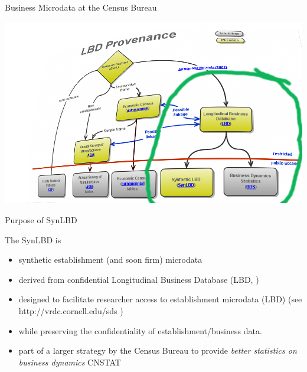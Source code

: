 \begin{frame}{Business Microdata at the Census Bureau}
\begin{center}
\includegraphics[height=0.8\textheight]{./LBD_Provenance_v2_tilted_hilite}
\end{center}
\end{frame}


\begin{frame}{Purpose of SynLBD}
\begin{block}{The SynLBD is }
\begin{itemize}[<+->]
\item synthetic establishment (and soon firm) microdata
\item derived from \alert{confidential} Longitudinal Business Database (LBD, 
\cite{MirandaJarmin2002})
\item designed to facilitate researcher access to establishment microdata (LBD) (see 
http://vrdc.cornell.edu/sds )
\item while preserving the confidentiality of establishment/business data. 
\item part of a larger strategy by the Census Bureau to provide \textit{better 
statistics on business dynamics} CNSTAT  \cite{CNSTATBusinessDynamics}
\end{itemize}
\end{block}
\end{frame}



